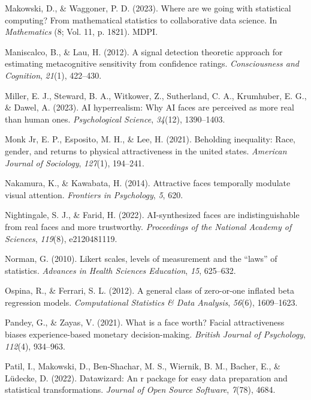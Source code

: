 \documentclass[
  jou,
  floatsintext,
  longtable,
  nolmodern,
  notxfonts,
  notimes,
  colorlinks=true,linkcolor=blue,citecolor=blue,urlcolor=blue]{apa7}
\newlength{\cslhangindent}
\newenvironment{CSLReferences}[2] %
 {\begin{list}{}{%
  \setlength{\itemindent}{0pt}
  \setlength{\leftmargin}{0pt}
  \setlength{\parsep}{0pt}
  \ifodd #1
   \setlength{\leftmargin}{\cslhangindent}
   \setlength{\itemindent}{-1\cslhangindent}
  \fi
  \setlength{\itemsep}{#2\baselineskip}}}
 {\end{list}}
\begin{document}
\begin{CSLReferences}{1}{0}
Makowski, D., \& Waggoner, P. D. (2023). Where are we going with
statistical computing? From mathematical statistics to collaborative
data science. In \emph{Mathematics} (8; Vol. 11, p. 1821). MDPI.

Maniscalco, B., \& Lau, H. (2012). A signal detection theoretic approach
for estimating metacognitive sensitivity from confidence ratings.
\emph{Consciousness and Cognition}, \emph{21}(1), 422--430.

Miller, E. J., Steward, B. A., Witkower, Z., Sutherland, C. A.,
Krumhuber, E. G., \& Dawel, A. (2023). AI hyperrealism: Why AI faces are
perceived as more real than human ones. \emph{Psychological Science},
\emph{34}(12), 1390--1403.

Monk Jr, E. P., Esposito, M. H., \& Lee, H. (2021). Beholding
inequality: Race, gender, and returns to physical attractiveness in the
united states. \emph{American Journal of Sociology}, \emph{127}(1),
194--241.

Nakamura, K., \& Kawabata, H. (2014). Attractive faces temporally
modulate visual attention. \emph{Frontiers in Psychology}, \emph{5},
620.

Nightingale, S. J., \& Farid, H. (2022). AI-synthesized faces are
indistinguishable from real faces and more trustworthy.
\emph{Proceedings of the National Academy of Sciences}, \emph{119}(8),
e2120481119.

Norman, G. (2010). Likert scales, levels of measurement and the
{``laws''} of statistics. \emph{Advances in Health Sciences Education},
\emph{15}, 625--632.

Ospina, R., \& Ferrari, S. L. (2012). A general class of zero-or-one
inflated beta regression models. \emph{Computational Statistics \& Data
Analysis}, \emph{56}(6), 1609--1623.

Pandey, G., \& Zayas, V. (2021). What is a face worth? Facial
attractiveness biases experience-based monetary decision-making.
\emph{British Journal of Psychology}, \emph{112}(4), 934--963.

Patil, I., Makowski, D., Ben-Shachar, M. S., Wiernik, B. M., Bacher, E.,
\& Lüdecke, D. (2022). Datawizard: An r package for easy data
preparation and statistical transformations. \emph{Journal of Open
Source Software}, \emph{7}(78), 4684.


\end{CSLReferences}
\end{document}
